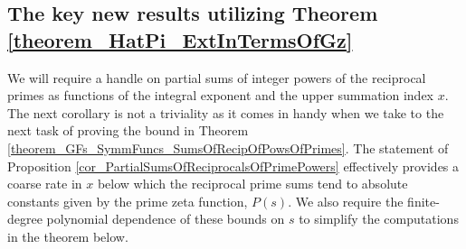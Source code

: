 \documentclass[11pt,reqno,a4letter]{article}
\numberwithin{figure}{section}
\numberwithin{table}{section}
\theoremstyle{plain}
\numberwithin{theorem}{section}
\theoremstyle{definition}
\begin{document}
\subsection{The key new results utilizing Theorem \ref{theorem_HatPi_ExtInTermsOfGz}} 
\label{subSection_PartialPrimeProducts_Proofs} 

We will require a handle on partial sums of integer powers of the reciprocal primes as 
functions of the integral exponent and the upper summation index $x$. 
The next corollary is not a triviality as it comes in handy when we take to the next task of 
proving the bound in Theorem \ref{theorem_GFs_SymmFuncs_SumsOfRecipOfPowsOfPrimes}. 
The statement of Proposition \ref{cor_PartialSumsOfReciprocalsOfPrimePowers} 
effectively provides a coarse rate in $x$ below which the reciprocal prime sums tend to 
absolute constants given by the prime zeta function, $P(s)$. We also require the finite-degree 
polynomial dependence of these bounds on $s$ to simplify the computations in the theorem below. 
\end{document}
